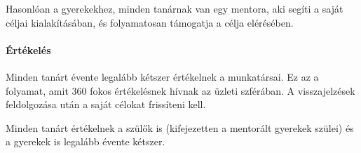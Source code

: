 Hasonlóan a gyerekekhez, minden tanárnak van egy mentora, aki segíti a saját
céljai kialakításában, és folyamatosan támogatja a célja elérésében.

\paragraph{Értékelés}

Minden tanárt évente legalább kétszer értékelnek a munkatársai. Ez az a folyamat,
amit 360 fokos értékelésnek hívnak az üzleti szférában. A visszajelzések
feldolgozása után a saját célokat frissíteni kell.

Minden tanárt értékelnek a szülők is (kifejezetten a mentorált gyerekek szülei)
és a gyerekek is legalább évente kétszer.
